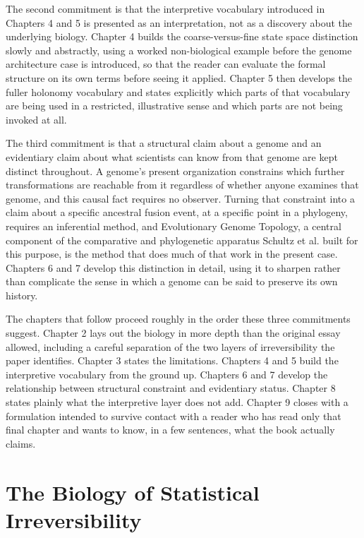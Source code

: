 \documentclass[11pt]{book}
\begin{document}
The second commitment is that the interpretive vocabulary introduced in Chapters 4 and 5 is presented as an interpretation, not as a discovery about the underlying biology. Chapter 4 builds the coarse-versus-fine state space distinction slowly and abstractly, using a worked non-biological example before the genome architecture case is introduced, so that the reader can evaluate the formal structure on its own terms before seeing it applied. Chapter 5 then develops the fuller holonomy vocabulary and states explicitly which parts of that vocabulary are being used in a restricted, illustrative sense and which parts are not being invoked at all.

The third commitment is that a structural claim about a genome and an evidentiary claim about what scientists can know from that genome are kept distinct throughout. A genome's present organization constrains which further transformations are reachable from it regardless of whether anyone examines that genome, and this causal fact requires no observer. Turning that constraint into a claim about a specific ancestral fusion event, at a specific point in a phylogeny, requires an inferential method, and Evolutionary Genome Topology, a central component of the comparative and phylogenetic apparatus Schultz et al. built for this purpose, is the method that does much of that work in the present case. Chapters 6 and 7 develop this distinction in detail, using it to sharpen rather than complicate the sense in which a genome can be said to preserve its own history.

The chapters that follow proceed roughly in the order these three commitments suggest. Chapter 2 lays out the biology in more depth than the original essay allowed, including a careful separation of the two layers of irreversibility the paper identifies. Chapter 3 states the limitations. Chapters 4 and 5 build the interpretive vocabulary from the ground up. Chapters 6 and 7 develop the relationship between structural constraint and evidentiary status. Chapter 8 states plainly what the interpretive layer does not add. Chapter 9 closes with a formulation intended to survive contact with a reader who has read only that final chapter and wants to know, in a few sentences, what the book actually claims.

\chapter{The Biology of Statistical Irreversibility}
\end{document}
